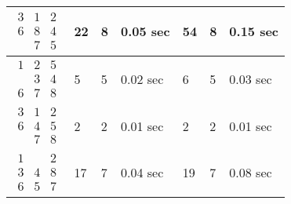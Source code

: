 \documentclass[a4paper]{article}
\begin{document}
\begin{table}[]
\begin{tabular}{|l|l|l|l|l|l|l|}
 $\begin{matrix} 3 & 1 & 2 \\ 6 & 8 & 4 \\   & 7 & 5 \end{matrix}$ & 22 & 8 & 0.05 sec & 54 & 8 & 0.15 sec \\ \hline
 $\begin{matrix} 1 & 2 & 5 \\   & 3 & 4 \\ 6 & 7 & 8 \end{matrix}$ & 5 & 5 & 0.02 sec & 6 & 5 & 0.03 sec \\ \hline
 $\begin{matrix} 3 & 1 & 2 \\ 6 & 4 & 5 \\   & 7 & 8 \end{matrix}$ & 2 & 2 & 0.01 sec & 2 & 2 & 0.01 sec \\ \hline
 $\begin{matrix} 1 &   & 2 \\ 3 & 4 & 8 \\ 6 & 5 & 7 \end{matrix}$ & 17 & 7 & 0.04 sec & 19 & 7 & 0.08 sec \\ \hline
\end{tabular}
\end{table}
\end{document}
